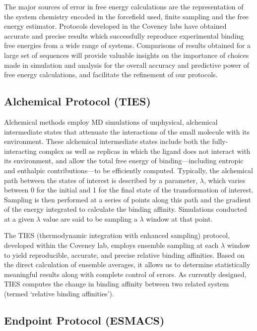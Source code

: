 \documentclass[conference]{IEEEtran}
\begin{document}
The major sources of error in free energy calculations are the representation of the system chemistry encoded in the forcefield used, finite sampling and the free energy estimator. Protocols developed in the Coveney labs have obtained accurate and precise results which successfully reproduce experimental binding free energies from a wide range of systems. \cite{Wright2014, Wan2017brd4, Wan2015, Wan2011} 
Comparisons of results obtained for a large set of sequences will provide valuable insights on the importance of choices made in simulation and analysis for the overall accuracy and predictive power of free energy calculations, and facilitate the refinement of our protocols.


\subsection{Alchemical Protocol (TIES)}\label{sec:ties}

Alchemical methods employ MD simulations of unphysical, alchemical intermediate states that attenuate the interactions of the small molecule with its environment. 
These alchemical intermediate states include both the fully-interacting complex as well as replicas in which the ligand does not interact with its environment, and allow the total free energy of binding—including entropic and enthalpic contributions—to be efficiently computed. Typically, the alchemical path between the states of interest is described by a parameter, $\lambda$, which varies between 0 for the initial and 1 for the final state of the transformation of interest. 
Sampling is then performed at a series of points along this path and the gradient of the energy integrated to calculate the binding affinity.
Simulations conducted at a given $\lambda$ value are said to be sampling a $\lambda$ window at that point.

The TIES (thermodynamic integration with enhanced sampling) protocol, developed within the Coveney lab, employs ensemble sampling at each $\lambda$ window to yield reproducible, accurate, and precise relative binding affinities. 
\cite{ Wan2017brd4} Based on the direct calculation of ensemble averages, it allows us to determine statistically meaningful results along with complete control of errors. 
As currently designed, TIES computes the change in binding affinity between two related system (termed ‘relative binding affinities’).


\subsection{Endpoint Protocol (ESMACS)}\label{sec:esmacs}
\end{document}
